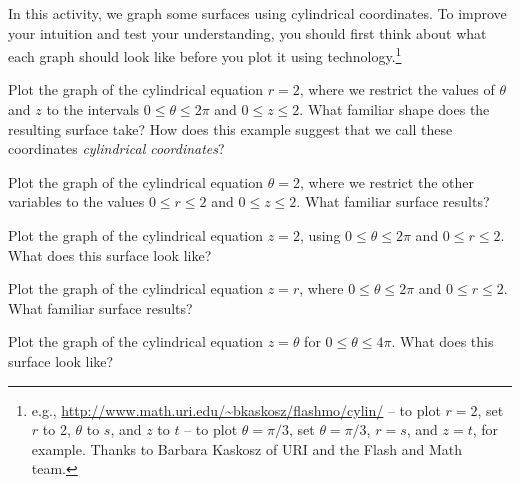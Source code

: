 \begin{activity} \label{A:11.8.1} In this activity, we graph some surfaces using cylindrical coordinates. To improve your intuition and test your understanding, you should first think about what each graph should look like before you plot it using technology.\footnote{e.g., \url{http://www.math.uri.edu/~bkaskosz/flashmo/cylin/} -- to plot $r=2$, set $r$ to 2, $\theta$ to $s$, and $z$ to $t$ -- to plot $\theta = \pi/3$, set $\theta = \pi/3$, $r=s$, and $z=t$, for example. Thanks to Barbara Kaskosz of URI and the Flash and Math team.}
    \ba
    \item Plot the graph of the cylindrical equation $r=2$, where we restrict the values of $\theta$ and $z$ to the intervals  $0 \leq \theta \leq 2\pi$ and $0 \leq z \leq 2$. What familiar shape does the resulting surface take?  How does this example suggest that we call these coordinates \emph{cylindrical coordinates}?



    \item Plot the graph of the cylindrical equation $\theta=2$, where we restrict the other variables to the values $0 \leq r \leq 2$ and $0 \leq z \leq 2$. What familiar surface results?



    \item Plot the graph of the cylindrical equation $z=2$, using $0 \leq \theta \leq 2\pi$ and $0 \leq r \leq 2$. What does this surface look like?



    \item Plot the graph of the cylindrical equation $z=r$, where $0 \leq \theta \leq 2\pi$ and $0 \leq r \leq 2$. What familiar surface results?



    \item Plot the graph of the cylindrical equation $z= \theta$ for $0 \leq \theta \leq 4 \pi$. What does this surface look like?



    \ea

\end{activity}
\begin{smallhint}

\end{smallhint}
\begin{bighint}

\end{bighint}
